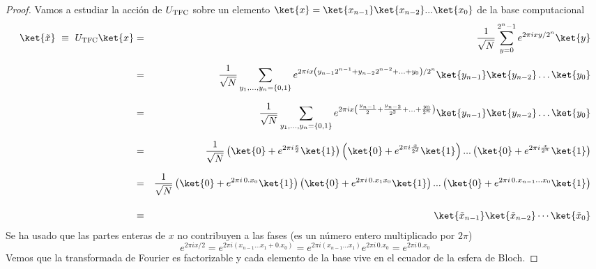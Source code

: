 \documentclass[a4paper,11pt]{book} %
\numberwithin{equation}{chapter}
\begin{document}
	\begin{proof}
	Vamos a estudiar la acción de $U_{\rm TFC}$ sobre un elemento $\ket{x} = \ket{x_{n-1}}\ket{x_{n-2}}... \ket{x_0}$ de la base computacional 
	\begin{eqnarray*}
 \ket{\tilde x}  ~\equiv ~  U_{\rm TFC}\ket{x}  &=&  \frac{1}{\sqrt{N}} \sum_{y=0}^{2^n-1} e^{2\pi i  xy/2^n}\ket{y}      \\ \rule{0mm}{7mm}
&=&  \frac{1}{\sqrt{N}} \sum_{y_1,...,y_n=\{0,1\}} e^{ 2\pi i x \left( y_{n-1}2^{n-1} + y_{n-2}2^{n-2}  + ... + y_0\right)/2^n } \ket{y_{n-1}}\ket{y_{n-2}}\ldots \ket{ y_0}   \\ \rule{0mm}{7mm}
&=&  \frac{1}{\sqrt{N}} \sum_{y_1,...,y_n=\{0,1\}} e^{2\pi i x \left(\frac{y_{n-1}}{2} + \frac{y_{n-2}}{2^2}  + ... + \frac{y_0}{2^n}\right) } \ket{y_{n-1}}\ket{y_{n-2}}\ldots \ket{ y_0}  \\ \rule{0mm}{7mm}
&=&  \frac{1}{\sqrt{N}} \left( \ket{0} + e^{2\pi i \frac{x}{2}}\ket{1}\right)\left( \ket{0} + e^{2\pi i \frac{x}{2^2}}\ket{1}\right)...\left( \ket{0} + e^{2\pi i \frac{x}{2^n}}\ket{1}\right) \\ \rule{0mm}{7mm}
&=& \frac{1}{\sqrt{N}} \left( \ket{0} + e^{2\pi i \, 0.x_0}\ket{1}\right)\left( \ket{0} + e^{2\pi i \, 0.x_1x_0}\ket{1}\right)...\left( \ket{0} + e^{2\pi i \, 0.x_{n-1}...x_0}\ket{1}\right)    \\ \rule{0mm}{7mm}
&\equiv & ~~ \ket{\tilde x_{n-1}}\ket{\tilde x_{n-2}}\cdots \ket{\tilde x_{0}}   
\end{eqnarray*}
Se ha usado que las partes enteras de $x$ no contribuyen a las fases (es un número entero multiplicado por $2\pi$)
	\begin{equation} \label{ec_QFT_demostracion_equiv_exp}
	e^{2\pi i x/2} = e^{2\pi i (x_{n-1}...x_1 + 0. x_0)}= e^{2\pi i (x_{n-1}...x_1)}e^{2\pi i \, 0. x_0} = e^{2\pi i\, 0.x_0}
	\end{equation}
Vemos que la transformada de Fourier es factorizable y cada elemento de la base vive en el ecuador de la esfera de Bloch.
	\end{proof}
\end{document}
